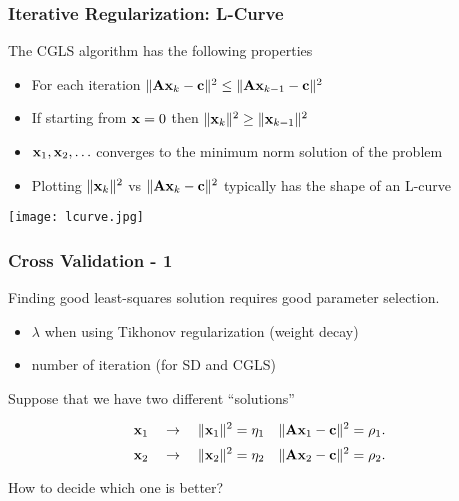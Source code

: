 \documentclass[12pt,fleqn,handout]{beamer}
\begin{document}
\begin{frame}
	\frametitle{Iterative Regularization: L-Curve}


The CGLS algorithm has the following properties
\begin{itemize}
\item For each iteration $\| {\bf A} {\bf x}_k -{\bf c} \|^2 \le \| {\bf A} {\bf x}_{k-1} -{\bf c} \|^2$
\item If starting from  ${\bf x}=0$ then $\|{\bf x}_k  \|^2 \ge \|  {\bf x}_{k-1}  \|^2$

\item ${\bf x}_1,{\bf x}_2,\ldots$ converges to the minimum norm solution of the problem
\item Plotting $\|{\bf x}_k\|^2$ vs $\| {\bf A}{\bf x}_k -{\bf c} \|^2$ typically has the shape of an L-curve
\end{itemize}



\begin{center}
\texttt{[image: lcurve.jpg]}
\end{center}
\end{frame}


\begin{frame}
	\frametitle{Cross Validation - 1}

Finding good least-squares solution requires good parameter selection.
\begin{itemize}
\item $\lambda$ when using Tikhonov regularization (weight decay)
\item number of iteration (for SD and CGLS)
\end{itemize}

\bigskip

Suppose that we have two different ``solutions''

$${\bf x}_1\quad  \rightarrow \quad  \|{\bf x}_1\|^2 = \eta_1 \quad \|{\bf A} {\bf x}_1 - {\bf c}\|^2 = \rho_1. $$
$${\bf x}_2\quad  \rightarrow \quad  \|{\bf x}_2\|^2 = \eta_2 \quad \|{\bf A} {\bf x}_2 - {\bf c}\|^2 = \rho_2. $$

How to decide which one is better?

\end{frame}
\end{document}
